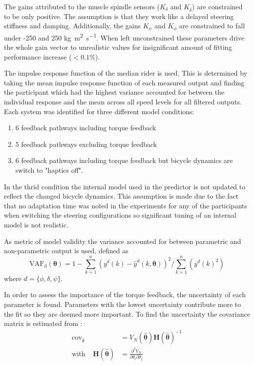 The gains attributed to the muscle spindle sensors (\ensuremath{K_\delta} and \ensuremath{K_{\dot{\delta}}}) are constrained to be only positive. The assumption is that they work like a delayed steering stiffness and damping. Additionally, the gains \ensuremath{K_\psi} and \ensuremath{K_\phi}  are constrained to fall under -250 and 250 \si{\kilogram\square\meter\per\second}.  When left unconstrained these parameters drive the whole gain vector to unrealistic values for insignificant amount of fitting performance increase (\ensuremath{<0.1\%}).

The impulse response function of the median rider is used. This is determined by taking the mean impulse response function of each measured output and finding the participant which had the highest variance accounted for between the individual response and the mean across all speed levels for all filtered outputs. Each system was identified for three different model conditions: 
\begin{enumerate}
    \item  6 feedback pathways including torque feedback
    \item  5 feedback pathways excluding torque feedback
    \item  6 feedback pathways including torque feedback but bicycle dynamics are switch to "haptics off".
\end{enumerate}
In the thrid condition the internal model used in the predictor is not updated to reflect the changed bicycle dynamics. This assumption is made due to the fact that no adaptation time  was noted in the experiments for any of the participants when switching the steering configurations so significant tuning of an internal model is not realistic. 

 As metric of model validity the variance accounted for between parametric and non-parametric output is used, defined as
\begin{equation}
\mathrm{VAF_d}(\boldsymbol{\theta})=1 -\sum_{k=1}^{n}\left(y^{d}(k)-\hat{y}^{d}(k, \boldsymbol{\theta})\right)^{2} / \sum_{k=1}^{n}\left(y^{d}(k)^{2}\right)
\end{equation} 
where \ensuremath{d=\{\phi,\delta,\psi\}}. 

In order to assess the importance of the torque feedback, the uncertainty of each parameter is found. Parameters with the lowest uncertainty contribute more to the fit so they are deemed more important. To find the uncertainty the covariance matrix is estimated from :
\begin{align}
    \operatorname{cov}_{\hat{\theta}}  &=V_N(\boldsymbol{\hat{\theta}})\boldsymbol{H}(\boldsymbol{\hat{\theta}})^{-1}
    \label{fig:cov_mat}
    \\ \text{with} \;\;\;\;  \boldsymbol{H}(\boldsymbol{\hat{\theta}})&= \frac{\partial^{2} V_N}{\partial \theta_{i} \partial \theta_{j}}
\end{align}

